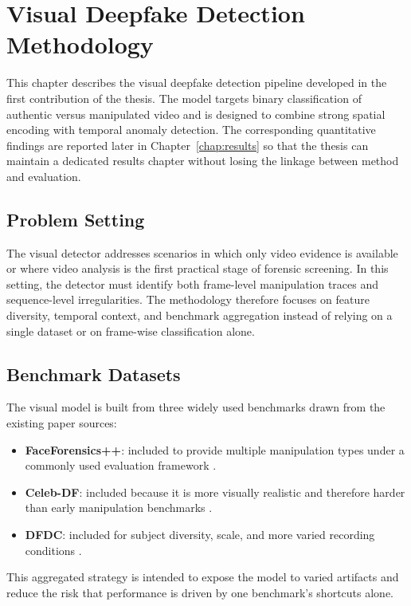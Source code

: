 \chapter{Visual Deepfake Detection Methodology}
\label{chap:visual-method}

This chapter describes the visual deepfake detection pipeline developed in the first contribution of the thesis. The model targets binary classification of authentic versus manipulated video and is designed to combine strong spatial encoding with temporal anomaly detection. The corresponding quantitative findings are reported later in Chapter~\ref{chap:results} so that the thesis can maintain a dedicated results chapter without losing the linkage between method and evaluation.

\section{Problem Setting}

The visual detector addresses scenarios in which only video evidence is available or where video analysis is the first practical stage of forensic screening. In this setting, the detector must identify both frame-level manipulation traces and sequence-level irregularities. The methodology therefore focuses on feature diversity, temporal context, and benchmark aggregation instead of relying on a single dataset or on frame-wise classification alone.

\section{Benchmark Datasets}

The visual model is built from three widely used benchmarks drawn from the existing paper sources:
\begin{itemize}
    \item \textbf{FaceForensics++}: included to provide multiple manipulation types under a commonly used evaluation framework \cite{roessler2019faceforensicspp}.
    \item \textbf{Celeb-DF}: included because it is more visually realistic and therefore harder than early manipulation benchmarks \cite{li2020celebdf}.
    \item \textbf{DFDC}: included for subject diversity, scale, and more varied recording conditions \cite{dolhansky2020dfdc}.
\end{itemize}

This aggregated strategy is intended to expose the model to varied artifacts and reduce the risk that performance is driven by one benchmark's shortcuts alone.

